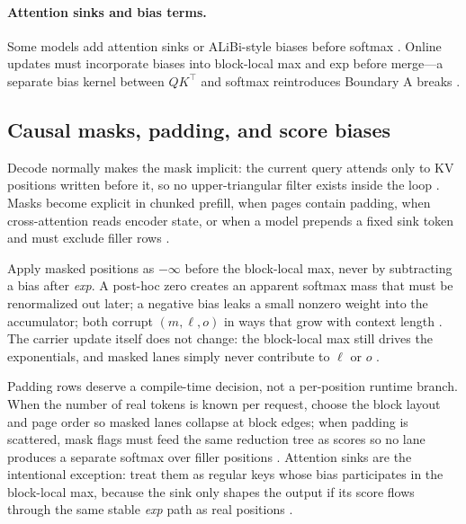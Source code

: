 \paragraph{Attention sinks and bias terms.} Some models add attention sinks or ALiBi-style biases before softmax \citep{liu2024deepseekv3}. Online updates must incorporate biases into block-local max and exp before merge---a separate bias kernel between $QK^\top$ and softmax reintroduces Boundary A breaks \citep{taxbreak2026,dao2022flashattention}.

\subsection{Causal masks, padding, and score biases}
\label{sec:ch10_masks_padding}

Decode normally makes the mask implicit: the current query attends only to KV positions written before it, so no upper-triangular filter exists inside the loop \citep{dao2023flashdecoding,kwon2023vllm}. Masks become explicit in chunked prefill, when pages contain padding, when cross-attention reads encoder state, or when a model prepends a fixed sink token and must exclude filler rows \citep{liu2024deepseekv3,dao2022flashattention}.

Apply masked positions as $-\infty$ before the block-local max, never by subtracting a bias after \emph{exp}. A post-hoc zero creates an apparent softmax mass that must be renormalized out later; a negative bias leaks a small nonzero weight into the accumulator; both corrupt $(m,\ell,o)$ in ways that grow with context length \citep{dao2022flashattention,memoryfloor2026}. The carrier update itself does not change: the block-local max still drives the exponentials, and masked lanes simply never contribute to $\ell$ or $o$ \citep{dao2023flashdecoding,patel2025llminference}.

Padding rows deserve a compile-time decision, not a per-position runtime branch. When the number of real tokens is known per request, choose the block layout and page order so masked lanes collapse at block edges; when padding is scattered, mask flags must feed the same reduction tree as scores so no lane produces a separate softmax over filler positions \citep{yirage2026,chen2020compilerbasedhardw}. Attention sinks are the intentional exception: treat them as regular keys whose bias participates in the block-local max, because the sink only shapes the output if its score flows through the same stable \emph{exp} path as real positions \citep{liu2024deepseekv3,taxbreak2026}.


